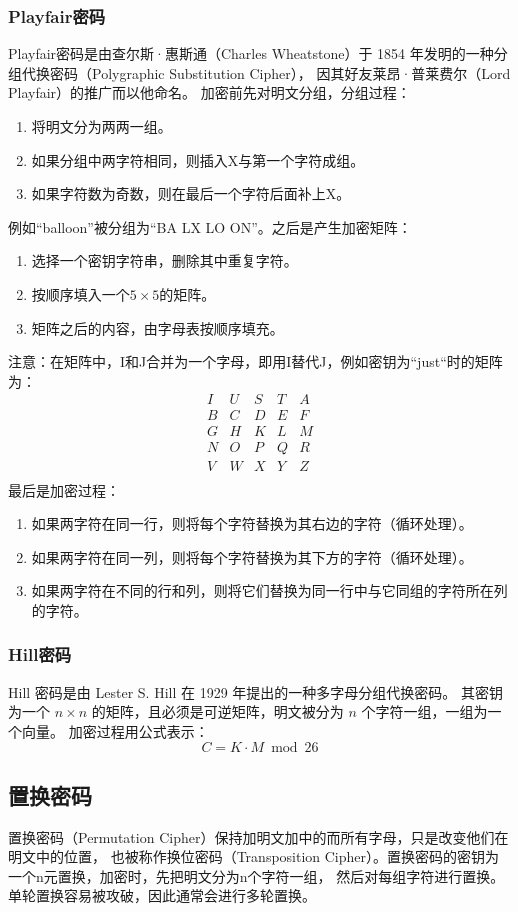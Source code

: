 \subsubsection{Playfair密码}
Playfair密码是由查尔斯·惠斯通（Charles Wheatstone）于 1854 年发明的一种分组代换密码（Polygraphic Substitution Cipher），
因其好友莱昂·普莱费尔（Lord Playfair）的推广而以他命名。
加密前先对明文分组，分组过程：
\begin{enumerate}
    \item 将明文分为两两一组。
    \item 如果分组中两字符相同，则插入X与第一个字符成组。
    \item 如果字符数为奇数，则在最后一个字符后面补上X。
\end{enumerate}
例如“balloon”被分组为“BA LX LO ON”。之后是产生加密矩阵：
\begin{enumerate}
    \item 选择一个密钥字符串，删除其中重复字符。
    \item 按顺序填入一个$5 \times 5$的矩阵。
    \item 矩阵之后的内容，由字母表按顺序填充。
\end{enumerate}
注意：在矩阵中，I和J合并为一个字母，即用I替代J，例如密钥为“just“时的矩阵为：
$$
\begin{array}{ccccc}
I & U & S & T & A \\
B & C & D & E & F \\
G & H & K & L & M \\
N & O & P & Q & R \\
V & W & X & Y & Z \\
\end{array}
$$
最后是加密过程：
\begin{enumerate}
    \item 如果两字符在同一行，则将每个字符替换为其右边的字符（循环处理）。
    \item 如果两字符在同一列，则将每个字符替换为其下方的字符（循环处理）。
    \item 如果两字符在不同的行和列，则将它们替换为同一行中与它同组的字符所在列的字符。
\end{enumerate}

\subsubsection{Hill密码}
Hill 密码是由 Lester S. Hill 在 1929 年提出的一种多字母分组代换密码。
其密钥为一个 $n \times n$ 的矩阵，且必须是可逆矩阵，明文被分为 $n$ 个字符一组，一组为一个向量。
加密过程用公式表示：
$$C = K \cdot M \bmod 26$$

\subsection{置换密码}
置换密码（Permutation Cipher）保持加明文加中的而所有字母，只是改变他们在明文中的位置，
也被称作换位密码（Transposition Cipher）。置换密码的密钥为一个n元置换，加密时，先把明文分为n个字符一组，
然后对每组字符进行置换。单轮置换容易被攻破，因此通常会进行多轮置换。